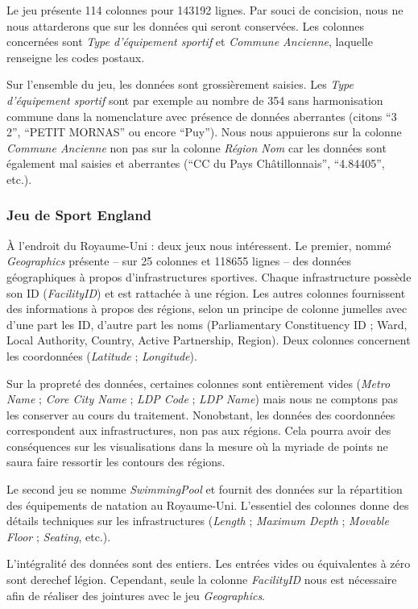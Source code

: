 \documentclass[hidelinks, 12pt]{article}
\begin{document}
Le jeu présente 114 colonnes pour 143192 lignes. Par souci de concision, nous ne nous attarderons que sur les données qui seront conservées. Les colonnes concernées sont \emph{Type d'équipement sportif} et \emph{Commune Ancienne}, laquelle renseigne les codes postaux.

Sur l'ensemble du jeu, les données sont grossièrement saisies. Les \emph{Type d'équipement sportif} sont par exemple au nombre de 354 sans harmonisation commune dans la nomenclature avec présence de données aberrantes (citons \enquote{3 2}, \enquote{PETIT MORNAS} ou encore \enquote{Puy}). Nous nous appuierons sur la colonne \emph{Commune Ancienne} non pas sur la colonne \emph{Région Nom} car les données sont également mal saisies et aberrantes (\enquote{CC du Pays Châtillonnais}, \enquote{4.84405}, etc.).

\subsubsection{Jeu de Sport England}

À l'endroit du Royaume-Uni : deux jeux nous intéressent. Le premier, nommé \emph{Geographics} présente -- sur 25 colonnes et 118655 lignes -- des données géographiques à propos d'infrastructures sportives. Chaque infrastructure possède son ID (\emph{FacilityID}) et est rattachée à une région. Les autres colonnes fournissent des informations à propos des régions, selon un principe de colonne jumelles avec d'une part les ID, d'autre part les noms (Parliamentary Constituency ID ; Ward, Local Authority, Country, Active Partnership, Region). Deux colonnes concernent les coordonnées (\emph{Latitude} ; \emph{Longitude}).

Sur la propreté des données, certaines colonnes sont entièrement vides (\emph{Metro Name} ; \emph{Core City Name} ; \emph{LDP Code} ; \emph{LDP Name}) mais nous ne comptons pas les conserver au cours du traitement. Nonobstant, les données des coordonnées correspondent aux infrastructures, non pas aux régions. Cela pourra avoir des conséquences sur les visualisations dans la mesure où la myriade de points ne saura faire ressortir les contours des régions. 

Le second jeu se nomme \emph{SwimmingPool} et fournit des données sur la répartition des équipements de natation au Royaume-Uni. L'essentiel des colonnes donne des détails techniques sur les infrastructures (\emph{Length} ; \emph{Maximum Depth} ; \emph{Movable Floor} ; \emph{Seating}, etc.).

L'intégralité des données sont des entiers. Les entrées vides ou équivalentes à zéro sont derechef légion. Cependant, seule la colonne \emph{FacilityID} nous est nécessaire afin de réaliser des jointures avec le jeu \emph{Geographics}. 
\end{document}
